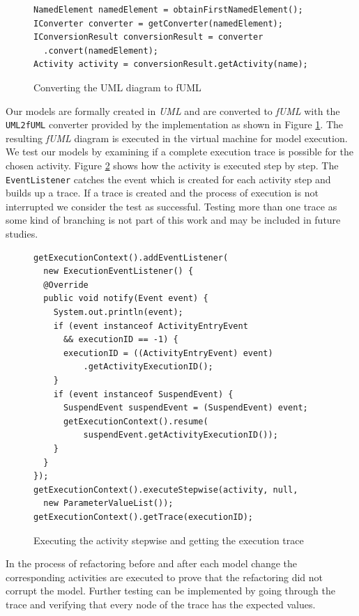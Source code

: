 \documentclass{llncs}
\begin{document}
\begin{figure}
 \begin{lstlisting}
NamedElement namedElement = obtainFirstNamedElement();
IConverter converter = getConverter(namedElement);
IConversionResult conversionResult = converter
  .convert(namedElement);
Activity activity = conversionResult.getActivity(name);
 \end{lstlisting}
 \caption{Converting the UML diagram to fUML}
 \label{lst:conversion}
\end{figure}

Our models are formally created in \textit{UML} and are converted to \textit{fUML} with the \lstinline|UML2fUML| converter 
provided by the implementation as shown in Figure \ref{lst:conversion}. The resulting \textit{fUML} diagram is executed in the 
virtual machine for model execution. 
We test our models by examining if a complete execution trace is possible for the chosen activity. Figure \ref{lst:execution} 
shows how the activity is executed step by step. The \lstinline|EventListener| catches the event which is created for each 
activity step and builds up a trace. If a trace is created and the process of execution is not interrupted we consider the 
test as successful. Testing more than one trace as some kind of branching is not part of this work and may be included in future studies.

\begin{figure}
 \begin{lstlisting}
getExecutionContext().addEventListener(
  new ExecutionEventListener() {
  @Override
  public void notify(Event event) {
    System.out.println(event);
    if (event instanceof ActivityEntryEvent 
      && executionID == -1) {
      executionID = ((ActivityEntryEvent) event)
          .getActivityExecutionID();
    }
    if (event instanceof SuspendEvent) {
      SuspendEvent suspendEvent = (SuspendEvent) event;
      getExecutionContext().resume(
          suspendEvent.getActivityExecutionID());
    }
  }
});
getExecutionContext().executeStepwise(activity, null, 
  new ParameterValueList());
getExecutionContext().getTrace(executionID);
 \end{lstlisting}
 \caption{Executing the activity stepwise and getting the execution trace}
 \label{lst:execution}
\end{figure}
In the process of refactoring before and after each model change the corresponding activities are executed to prove that 
the refactoring did not corrupt the model. 
Further testing can be implemented by going through the trace and verifying 
that every node of the trace has the expected values.
\end{document}
